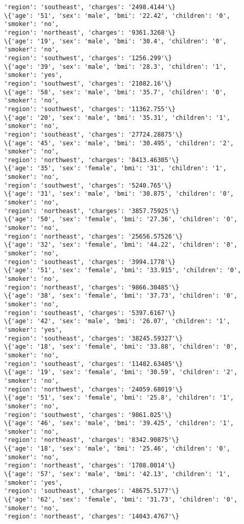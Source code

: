\documentclass[11pt]{article}
\begin{document}
\begin{Verbatim}[commandchars=\\\{\}]
'region': 'southeast', 'charges': '2498.4144'\}
\{'age': '51', 'sex': 'male', 'bmi': '22.42', 'children': '0', 'smoker': 'no',
'region': 'northeast', 'charges': '9361.3268'\}
\{'age': '19', 'sex': 'male', 'bmi': '30.4', 'children': '0', 'smoker': 'no',
'region': 'southwest', 'charges': '1256.299'\}
\{'age': '39', 'sex': 'male', 'bmi': '28.3', 'children': '1', 'smoker': 'yes',
'region': 'southwest', 'charges': '21082.16'\}
\{'age': '58', 'sex': 'male', 'bmi': '35.7', 'children': '0', 'smoker': 'no',
'region': 'southwest', 'charges': '11362.755'\}
\{'age': '20', 'sex': 'male', 'bmi': '35.31', 'children': '1', 'smoker': 'no',
'region': 'southeast', 'charges': '27724.28875'\}
\{'age': '45', 'sex': 'male', 'bmi': '30.495', 'children': '2', 'smoker': 'no',
'region': 'northwest', 'charges': '8413.46305'\}
\{'age': '35', 'sex': 'female', 'bmi': '31', 'children': '1', 'smoker': 'no',
'region': 'southwest', 'charges': '5240.765'\}
\{'age': '31', 'sex': 'male', 'bmi': '30.875', 'children': '0', 'smoker': 'no',
'region': 'northeast', 'charges': '3857.75925'\}
\{'age': '50', 'sex': 'female', 'bmi': '27.36', 'children': '0', 'smoker': 'no',
'region': 'northeast', 'charges': '25656.57526'\}
\{'age': '32', 'sex': 'female', 'bmi': '44.22', 'children': '0', 'smoker': 'no',
'region': 'southeast', 'charges': '3994.1778'\}
\{'age': '51', 'sex': 'female', 'bmi': '33.915', 'children': '0', 'smoker': 'no',
'region': 'northeast', 'charges': '9866.30485'\}
\{'age': '38', 'sex': 'female', 'bmi': '37.73', 'children': '0', 'smoker': 'no',
'region': 'southeast', 'charges': '5397.6167'\}
\{'age': '42', 'sex': 'male', 'bmi': '26.07', 'children': '1', 'smoker': 'yes',
'region': 'southeast', 'charges': '38245.59327'\}
\{'age': '18', 'sex': 'female', 'bmi': '33.88', 'children': '0', 'smoker': 'no',
'region': 'southeast', 'charges': '11482.63485'\}
\{'age': '19', 'sex': 'female', 'bmi': '30.59', 'children': '2', 'smoker': 'no',
'region': 'northwest', 'charges': '24059.68019'\}
\{'age': '51', 'sex': 'female', 'bmi': '25.8', 'children': '1', 'smoker': 'no',
'region': 'southwest', 'charges': '9861.025'\}
\{'age': '46', 'sex': 'male', 'bmi': '39.425', 'children': '1', 'smoker': 'no',
'region': 'northeast', 'charges': '8342.90875'\}
\{'age': '18', 'sex': 'male', 'bmi': '25.46', 'children': '0', 'smoker': 'no',
'region': 'northeast', 'charges': '1708.0014'\}
\{'age': '57', 'sex': 'male', 'bmi': '42.13', 'children': '1', 'smoker': 'yes',
'region': 'southeast', 'charges': '48675.5177'\}
\{'age': '62', 'sex': 'female', 'bmi': '31.73', 'children': '0', 'smoker': 'no',
'region': 'northeast', 'charges': '14043.4767'\}

\end{Verbatim}
\end{document}
